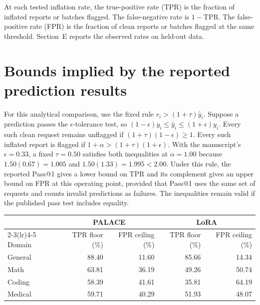 \documentclass[11pt]{article}
\begin{document}
At each tested inflation rate, the true-positive rate (TPR) is the fraction of inflated reports or batches flagged. The false-negative rate is \(1-\mathrm{TPR}\). The false-positive rate (FPR) is the fraction of clean reports or batches flagged at the same threshold. Section~E reports the observed rates on held-out data.

\section{Bounds implied by the reported prediction results}
\label{app:bounds}
For this analytical comparison, use the fixed rule \(r_i>(1+\tau)\hat y_i\). Suppose a prediction passes the \(\epsilon\)-tolerance test, so \((1-\epsilon)y_i\le\hat y_i\le(1+\epsilon)y_i\). Every such clean request remains unflagged if \((1+\tau)(1-\epsilon)\ge1\). Every such inflated report is flagged if \(1+\alpha>(1+\tau)(1+\epsilon)\). With the manuscript's \(\epsilon=0.33\), a fixed \(\tau=0.50\) satisfies both inequalities at \(\alpha=1.00\) because \(1.50(0.67)=1.005\) and \(1.50(1.33)=1.995<2.00\). Under this rule, the reported Pass@1 gives a lower bound on TPR and its complement gives an upper bound on FPR at this operating point, provided that Pass@1 uses the same set of requests and counts invalid predictions as failures. The inequalities remain valid if the published pass test includes equality.

\begin{center}
\begin{minipage}{\linewidth}
\centering
{}\label{tab:supp-bounds}
\begin{tabular}{lrrrr}
\toprule
 & \multicolumn{2}{c}{PALACE} & \multicolumn{2}{c}{LoRA}\\
\cmidrule(lr){2-3}\cmidrule(lr){4-5}
Domain & TPR floor (\%) & FPR ceiling (\%) & TPR floor (\%) & FPR ceiling (\%)\\
\midrule
General & 88.40 & 11.60 & 85.66 & 14.34\\
Math    & 63.81 & 36.19 & 49.26 & 50.74\\
Coding  & 58.39 & 41.61 & 35.81 & 64.19\\
Medical & 59.71 & 40.29 & 51.93 & 48.07\\
\bottomrule
\end{tabular}
\end{minipage}
\end{center}
\end{document}
